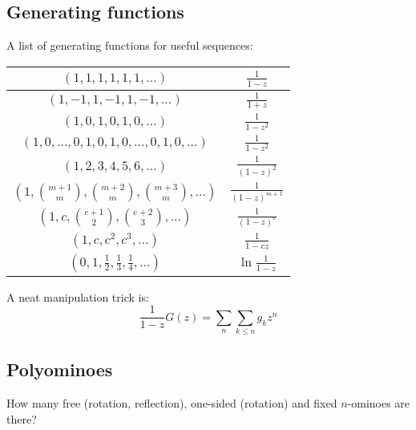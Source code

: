 \subsection{Generating functions}
  A list of generating functions for useful sequences:

  \begin{tabular}{|c|c|}
    \hline
    $(1,1,1,1,1,1,\ldots)$ & $\frac{1}{1-z}$ \\ \hline
    $(1,-1,1,-1,1,-1,\ldots)$ & $\frac{1}{1+z}$ \\ \hline
    $(1,0,1,0,1,0,\ldots)$ & $\frac{1}{1-z^2}$ \\ \hline
    $(1,0,\ldots,0,1,0,1,0,\ldots,0,1,0,\ldots)$ & $\frac{1}{1-z^2}$ \\ \hline
    $(1,2,3,4,5,6,\ldots)$ & $\frac{1}{(1-z)^2}$ \\ \hline
    $(1,\binom{m+1}{m},\binom{m+2}{m},\binom{m+3}{m},\ldots)$ & $\frac{1}{(1-z)^{m+1}}$ \\ \hline
    $(1,c,\binom{c+1}{2},\binom{c+2}{3},\ldots)$ & $\frac{1}{(1-z)^c}$ \\ \hline
    $(1,c,c^2, c^3, \ldots)$ & $\frac{1}{1-cz}$ \\ \hline
    $(0,1,\frac{1}{2},\frac{1}{3},\frac{1}{4},\ldots)$ & $\ln \frac{1}{1-z}$ \\ \hline
  \end{tabular}

A neat manipulation trick is:
\begin{equation*}
  \frac{1}{1-z}G(z) = \sum_{n}\sum_{k\leq n}g_kz^n
\end{equation*}

\subsection{Polyominoes} How many free (rotation, reflection), one-sided (rotation) and fixed $n$-ominoes are there?
      

